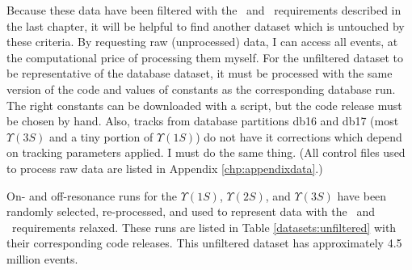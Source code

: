 Because these data have been filtered with the \lfourdec\ and \visen\
requirements described in the last chapter, it will be helpful to find
another dataset which is untouched by these criteria.  By requesting
raw (unprocessed) data, I can access all events, at the computational
price of processing them myself.  For the unfiltered dataset to be
representative of the database dataset, it must be processed with the
same version of the code and values of constants as the corresponding
database run.  The right constants can be downloaded with a script,
but the code release must be chosen by hand.  Also, tracks from
database partitions db16 and db17 (most $\Upsilon(3S)$ and a tiny
portion of $\Upsilon(1S)$) do not have it corrections which depend on
tracking parameters applied.  I must do the same thing.  (All control
files used to process raw data are listed in Appendix
\ref{chp:appendixdata}.)

On- and off-resonance runs for the $\Upsilon(1S)$, $\Upsilon(2S)$, and
$\Upsilon(3S)$ have been randomly selected, re-processed, and used to
represent data with the \lfourdec\ and \hotvisen\ requirements relaxed.
These runs are listed in Table \ref{datasets:unfiltered} with their
corresponding code releases.  This unfiltered dataset has
approximately 4.5 million events.

